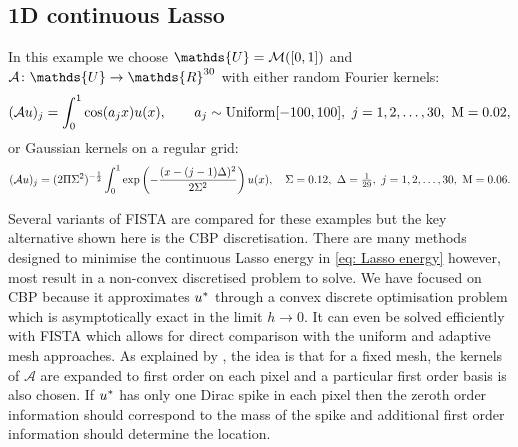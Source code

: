\documentclass[10pt,a4paper,onecolumn]{article}
\numberwithin{equation}{section}
\let\F\mathds\let\C\mathcal\newcommand{\R}{\F{R}}\newcommand{\A}{\C{A}}
\newcommand{\op}[1]{\operatorname{#1}}\newcommand{\overtext}[2]{\stackrel{\text{#1}}{#2}}
\newcommand*{\varf}[1]{%
	\IfEqCase{#1}{%
		{0}{u}%
		{1}{v}%
		{2}{w}%
	}[u#1]%
}
\newcommand*{\spcf}[1]{%
	\IfEqCase{#1}{%
		{0}{\F{U}}%
		{1}{\F{V}}%
		{2}{\F{W}}%
	}[\F{U}#1]%
}
\newcommand*{\varx}[1]{%
	\IfEqCase{#1}{%
		{0}{x}%
		{1}{y}%
		{2}{z}%
		{3}{r}%
	}[x#1]%
}
\newcommand*{\vars}[1]{%
	\IfEqCase{#1}{%
		{0}{\alpha}%
		{1}{\beta}%
		{2}{\gamma}%
		{3}{a}%
		{4}{b}%
		{5}{c}%
	}[k#1]%
}
\newcommand{\meshsize}{h}
\begin{document}
\subsection{1D continuous Lasso}\label{sec: 1D Lasso examples}
In this example we choose $\spcf0=\C M([0,1])$ and $\A\colon \spcf0\to \R^{30}$ with either random Fourier kernels:
\begin{equation}
	(\A\varf0)_j = \int_0^1\cos(\vars3_j\varx0)\varf0(\varx0), \qquad \vars3_j\sim \op{Uniform}[-100,100],\ j=1,2,\ldots,30,\ \mu =0.02, 
\end{equation}
or Gaussian kernels on a regular grid:
\begin{equation}
	(\A\varf0)_j = (2\pi\sigma^2)^{-\frac12}\int_0^1\exp\left(-\frac{(\varx0-(j-1)\Delta)^2}{2\sigma^2}\right)\varf0(\varx0), \quad \sigma=0.12,\ \Delta = \tfrac1{29},\ j=1,2,\ldots,30,\ \mu=0.06.
\end{equation}

Several variants of FISTA are compared for these examples but the key alternative shown here is the CBP discretisation. There are many methods designed to minimise the continuous Lasso energy in \eqref{eq: Lasso energy} \citep[c.f.][]{Bredies2013,Castro2016,Boyd2017,Catala2019} however, most result in a non-convex discretised problem to solve. We have focused on CBP because it approximates $\varf0^*$ through a convex discrete optimisation problem which is asymptotically exact in the limit $\meshsize\to0$. It can even be solved efficiently with FISTA which allows for direct comparison with the uniform and adaptive mesh approaches. As explained by \citet{Ekanadham2011, Duval2017b}, the idea is that for a fixed mesh, the kernels of $\A$ are expanded to first order on each pixel and a particular first order basis is also chosen. If $\varf0^*$ has only one Dirac spike in each pixel then the zeroth order information should correspond to the mass of the spike and additional first order information should determine the location.
\end{document}
